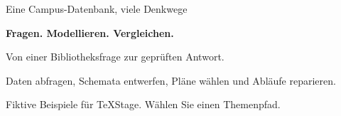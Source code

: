 \begin{frame}[t]{Eine Campus-Datenbank, viele Denkwege}

{\huge\bfseries Fragen. Modellieren. Vergleichen.}\par
\vspace{7mm}\large Von einer Bibliotheksfrage zur geprüften Antwort.\par
\vspace{6mm}\normalsize Daten abfragen, Schemata entwerfen, Pläne wählen und Abläufe reparieren.\par
\vfill Fiktive Beispiele für TeXStage. Wählen Sie einen Themenpfad.

\end{frame}
